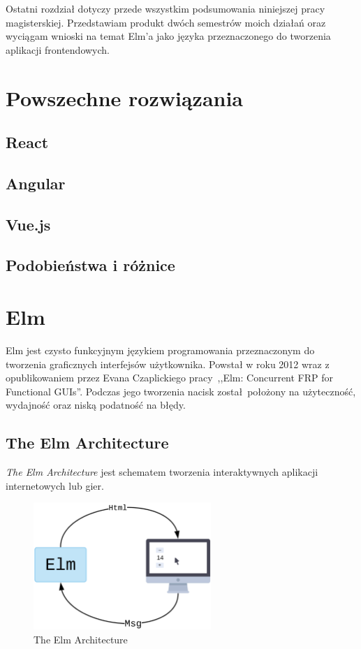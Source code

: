 \documentclass[twoside,a4paper]{report}
\begin{document}
Ostatni rozdział dotyczy przede wszystkim podsumowania niniejszej pracy magisterskiej. Przedstawiam produkt dwóch semestrów moich działań oraz wyciągam wnioski na temat Elm'a jako języka przeznaczonego do tworzenia aplikacji frontendowych.


\chapter{Powszechne rozwiązania}

\section{React}
\cite{react}
\cite{reactdocs}
\section{Angular}
\cite{angularjs}
\cite{angulardocs}
\section{Vue.js}
\cite{vuejsdocs}
\section{Podobieństwa i różnice}


\chapter{Elm}
Elm\cite{elmdocs} jest czysto funkcyjnym językiem programowania przeznaczonym do tworzenia graficznych interfejsów użytkownika.
Powstał w roku 2012 wraz z opublikowaniem przez Evana Czaplickiego pracy~,,Elm: Concurrent FRP for Functional GUIs''\cite{Czaplicki2012ElmC}.
Podczas jego tworzenia nacisk został położony na użyteczność, wydajność oraz niską podatność na błędy.

\section{The Elm Architecture}
\textit{The Elm Architecture} jest schematem tworzenia interaktywnych aplikacji internetowych lub gier.
\begin{figure}[h]
    \centering
    \includegraphics[width=0.6\textwidth]{elm_arch.png}
    \caption{The Elm Architecture}\label{fig:elm_arch}
\end{figure}
\end{document}
